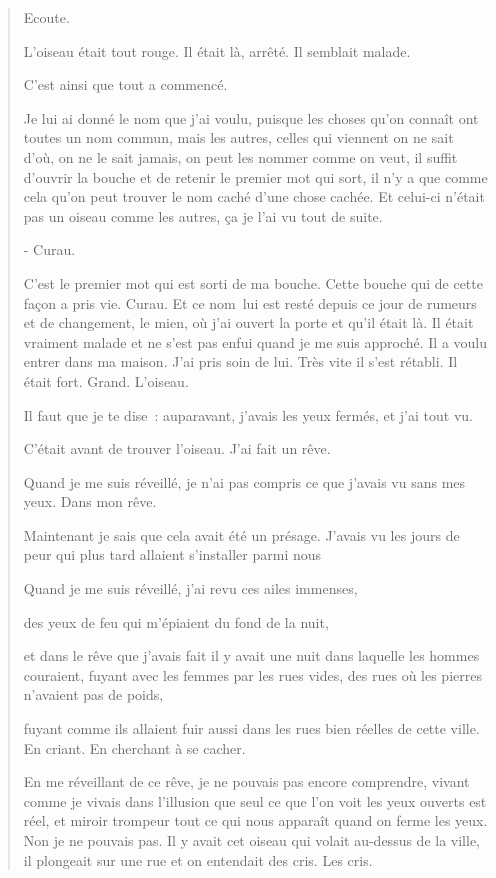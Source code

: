 \begin{quote}
Ecoute.

L'oiseau était tout rouge. Il était là, arrêté. Il semblait malade.

C'est ainsi que tout a commencé.

Je lui ai donné le nom que j'ai voulu, puisque les choses qu'on connaît
ont toutes un nom commun, mais les autres, celles qui viennent on ne
sait d'où, on ne le sait jamais, on peut les nommer comme on veut, il
suffit d'ouvrir la bouche et de retenir le premier mot qui sort, il n'y
a que comme cela qu'on peut trouver le nom caché d'une chose cachée. Et
celui-ci n'était pas un oiseau comme les autres, ça je l'ai vu tout de
suite.

- Curau.

C'est le premier mot qui est sorti de ma bouche. Cette bouche qui de
cette façon a pris vie. Curau. Et ce nom~lui est resté depuis ce jour de
rumeurs et de changement, le mien, où j'ai ouvert la porte et qu'il
était là. Il était vraiment malade et ne s'est pas enfui quand je me
suis approché. Il a voulu entrer dans ma maison. J'ai pris soin de lui.
Très vite il s'est rétabli. Il était fort. Grand. L'oiseau.

Il faut que je te dise~: auparavant, j'avais les yeux fermés, et j'ai
tout vu.

C'était avant de trouver l'oiseau. J'ai fait un rêve.

Quand je me suis réveillé, je n'ai pas compris ce que j'avais vu sans
mes yeux. Dans mon rêve.

Maintenant je sais que cela avait été un présage. J'avais vu les jours
de peur qui plus tard allaient s'installer parmi nous

Quand je me suis réveillé, j'ai revu ces ailes immenses,

des yeux de feu qui m'épiaient du fond de la nuit,

et dans le rêve que j'avais fait il y avait une nuit dans laquelle les
hommes couraient, fuyant avec les femmes par les rues vides, des rues où
les pierres n'avaient pas de poids,

fuyant comme ils allaient fuir aussi dans les rues bien réelles de cette
ville. En criant. En cherchant à se cacher.

En me réveillant de ce rêve, je ne pouvais pas encore comprendre, vivant
comme je vivais dans l'illusion que seul ce que l'on voit les yeux
ouverts est réel, et miroir trompeur tout ce qui nous apparaît quand on
ferme les yeux. Non je ne pouvais pas. Il y avait cet oiseau qui volait
au-dessus de la ville, il plongeait sur une rue et on entendait des
cris. Les cris.


\end{quote}
